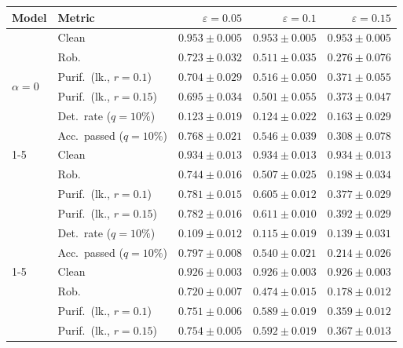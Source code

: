 \begin{table}[htbp]
  \centering
  \small
  \begin{tabular}{@{}llrrr@{}}
    \toprule
    Model & Metric & $\varepsilon=0.05$ & $\varepsilon=0.1$ & $\varepsilon=0.15$ \\
    \midrule
    \multirow{6}{*}{$\alpha{=}0$} & Clean & $\mathbf{0.953 \pm 0.005}$ & $\mathbf{0.953 \pm 0.005}$ & $\mathbf{0.953 \pm 0.005}$ \\
     & Rob. & $0.723 \pm 0.032$ & $\mathbf{0.511 \pm 0.035}$ & $\mathbf{0.276 \pm 0.076}$ \\
     & Purif.\ (lk., $r{=}0.1$) & $0.704 \pm 0.029$ & $0.516 \pm 0.050$ & $0.371 \pm 0.055$ \\
     & Purif.\ (lk., $r{=}0.15$) & $0.695 \pm 0.034$ & $0.501 \pm 0.055$ & $0.373 \pm 0.047$ \\
     & Det.\ rate ($q{=}10\%$) & $0.123 \pm 0.019$ & $0.124 \pm 0.022$ & $0.163 \pm 0.029$ \\
     & Acc.\ passed ($q{=}10\%$) & $0.768 \pm 0.021$ & $\mathbf{0.546 \pm 0.039}$ & $\mathbf{0.308 \pm 0.078}$ \\
    \cmidrule(lr){1-5}
    \multirow{6}{*}{$\alpha{=}0.01$} & Clean & $0.934 \pm 0.013$ & $0.934 \pm 0.013$ & $0.934 \pm 0.013$ \\
     & Rob. & $\mathbf{0.744 \pm 0.016}$ & $0.507 \pm 0.025$ & $0.198 \pm 0.034$ \\
     & Purif.\ (lk., $r{=}0.1$) & $\mathbf{0.781 \pm 0.015}$ & $\mathbf{0.605 \pm 0.012}$ & $\mathbf{0.377 \pm 0.029}$ \\
     & Purif.\ (lk., $r{=}0.15$) & $\mathbf{0.782 \pm 0.016}$ & $\mathbf{0.611 \pm 0.010}$ & $\mathbf{0.392 \pm 0.029}$ \\
     & Det.\ rate ($q{=}10\%$) & $0.109 \pm 0.012$ & $0.115 \pm 0.019$ & $0.139 \pm 0.031$ \\
     & Acc.\ passed ($q{=}10\%$) & $\mathbf{0.797 \pm 0.008}$ & $0.540 \pm 0.021$ & $0.214 \pm 0.026$ \\
    \cmidrule(lr){1-5}
    \multirow{6}{*}{$\alpha{=}0.1$} & Clean & $0.926 \pm 0.003$ & $0.926 \pm 0.003$ & $0.926 \pm 0.003$ \\
     & Rob. & $0.720 \pm 0.007$ & $0.474 \pm 0.015$ & $0.178 \pm 0.012$ \\
     & Purif.\ (lk., $r{=}0.1$) & $0.751 \pm 0.006$ & $0.589 \pm 0.019$ & $0.359 \pm 0.012$ \\
     & Purif.\ (lk., $r{=}0.15$) & $0.754 \pm 0.005$ & $0.592 \pm 0.019$ & $0.367 \pm 0.013$ \\

\end{tabular}
\end{table}
